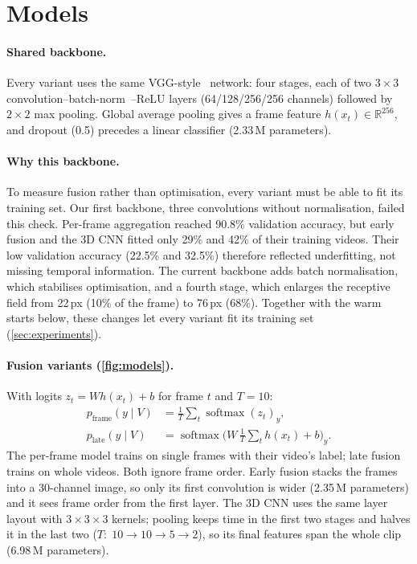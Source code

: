 

\section{Models}
\label{sec:method}
\paragraph{Shared backbone.}
Every variant uses the same VGG-style~\cite{simonyan2015vgg} network: four
stages, each of two $3{\times}3$
convolution--batch-norm~\cite{ioffe2015batchnorm}--ReLU layers
(64/128/256/256 channels) followed by $2{\times}2$ max pooling. Global
average pooling gives a frame feature $h(x_t)\in\mathbb{R}^{256}$, and
dropout (0.5) precedes a linear classifier (2.33\,M parameters).

\paragraph{Why this backbone.}
To measure fusion rather than optimisation, every variant must be able to
fit its training set. Our first backbone, three convolutions without
normalisation, failed this check. Per-frame aggregation reached 90.8\%
validation accuracy, but early fusion and the 3D CNN fitted only 29\% and
42\% of their training videos. Their low validation accuracy (22.5\% and
32.5\%) therefore reflected underfitting, not missing temporal information.
The current backbone adds batch normalisation, which stabilises
optimisation, and a fourth stage, which enlarges the receptive field from
22\,px (10\% of the frame) to 76\,px (68\%). Together with the warm starts
below, these changes let every variant fit its training set
(\cref{sec:experiments}).

\paragraph{Fusion variants (\cref{fig:models}).}
With logits $z_t=Wh(x_t)+b$ for frame $t$ and $T=10$:
\begin{align}
  p_\mathrm{frame}(y\mid V) &= \tfrac{1}{T}\textstyle\sum_t \operatorname{softmax}(z_t)_y,\\
  p_\mathrm{late}(y\mid V)  &= \operatorname{softmax}\big(W\,\tfrac{1}{T}\textstyle\sum_t h(x_t)+b\big)_y.
\end{align}
The per-frame model trains on single frames with their video's label;
late fusion trains on whole videos. Both ignore frame order. Early fusion
stacks the frames into a 30-channel image, so only its first convolution
is wider (2.35\,M parameters) and it sees frame order from the first layer.
The 3D CNN uses the same layer layout with $3{\times}3{\times}3$ kernels;
pooling keeps time in the first two stages and halves it in the last two
($T{:}\;10\to10\to5\to2$), so its final features span the whole clip
(6.98\,M parameters).

